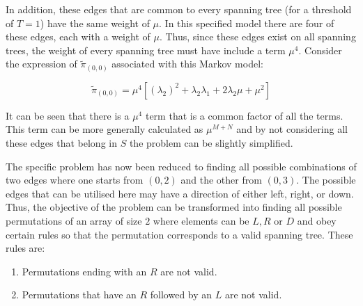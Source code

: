 In addition, these edges that are common to every spanning tree (for a threshold
of \(T=1\)) have the same weight of \(\mu\).
In this specified model there are four of these edges, each with a weight of
\(\mu\).
Thus, since these edges exist on all spanning trees, the weight of every
spanning tree must have include a term \(\mu^4\).
Consider the expression of \(\tilde{\pi}_{(0,0)}\) associated with this Markov
model:

\begin{equation}\label{eq:pi_00_rate_example}
    \tilde{\pi}_{(0,0)} = \mu^4[(\lambda_2)^2 + \lambda_2 \lambda_1
    + 2\lambda_2 \mu + \mu^2]
\end{equation}

It can be seen that there is a \(\mu^4\) term that is a common factor of all the
 terms.
This term can be more generally calculated as \(\mu^{M+N}\) and by not
considering all these edges that belong in \(S\) the problem can be slightly
simplified.

\begin{figure}[H]
    \centering
\end{figure}

The specific problem has now been reduced to finding all possible combinations
of two edges where one starts from \((0,2)\) and the other from \((0,3)\).
The possible edges that can be utilised here may have a direction of either
left, right, or down.
Thus, the objective of the problem can be transformed into finding all possible
permutations of an array of size \(2\) where elements can be \(L, R \text{ or }
D\) and obey certain rules so that the permutation corresponds to a valid
spanning tree.
These rules are:

\begin{enumerate}
    \item Permutations ending with an \(R\) are not valid. \label{rule1}
    \item Permutations that have an \(R\) followed by an \(L\) are not valid.
    \label{rule2}
\end{enumerate}

